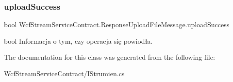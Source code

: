 \subsubsection{\texorpdfstring{upload\+Success}{uploadSuccess}}
{\footnotesize\ttfamily bool Wcf\+Stream\+Service\+Contract.\+Response\+Upload\+File\+Message.\+upload\+Success}



bool Informacja o tym, czy operacja się powiodła. 



The documentation for this class was generated from the following file\+:\begin{DoxyCompactItemize}
\item 
Wcf\+Stream\+Service\+Contract/I\+Strumien.\+cs\end{DoxyCompactItemize}
